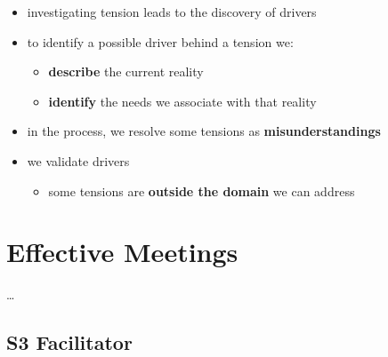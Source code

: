 \begin{itemize}
\item investigating tension leads to the discovery of drivers

\item to identify a possible driver behind a tension we:

\begin{itemize}
\item \textbf{describe} the current reality

\item \textbf{identify} the needs we associate with that reality

\end{itemize}

\item in the process, we resolve some tensions as \textbf{misunderstandings}

\item we validate drivers

\begin{itemize}
\item some tensions are \textbf{outside the domain} we can address

\end{itemize}

\end{itemize}

\chapter{Effective Meetings}
\label{effectivemeetings}

{\ldots}

\section{S3 Facilitator}
\label{s3facilitator}

